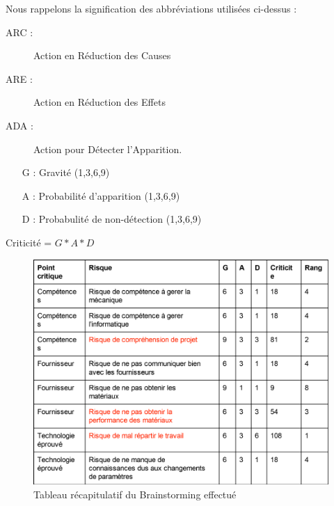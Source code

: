 \documentclass[a4paper, 12pt, leqno]{report}
\theoremstyle{plain}
\begin{document}
              Nous rappelons la signification des abbréviations utilisées ci-dessus :
              \begin{description}
              \item[ARC :] Action en Réduction des Causes
              \item[ARE :] Action en Réduction des Effets
              \item[ADA :] Action pour Détecter l'Apparition.
              \end{description}
              \begin{itemize}
              \item[G :] Gravité (1,3,6,9)
              \item[A :] Probabilité d'apparition (1,3,6,9)
              \item[D :] Probabulité de non-détection (1,3,6,9)
              \end{itemize}
              Criticité = $G*A*D$
    \begin{figure}[H]
           \begin{center}
           \includegraphics[scale=0.75]{Files/Analyse_des_risques.pdf}
           \end{center}
           \caption{Tableau récapitulatif du Brainstorming effectué}
           \label{Tableau récapitulatif du Brainstorming effectué}
           \end{figure}

     
                     
              
   
                
\end{document}

